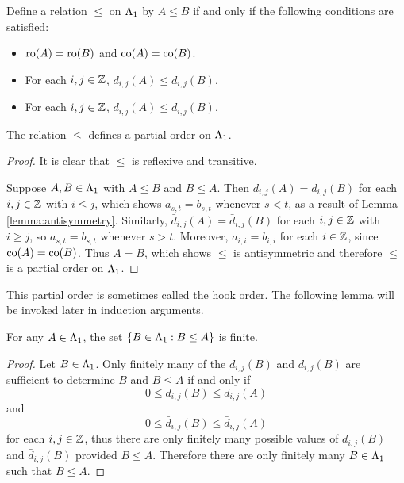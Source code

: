 \documentclass[a4paper, 11pt]{report}
\begin{document}
Define a relation $\le$ on $\Lambda_1{}$ by $A\le B$ if and only if the following conditions are satisfied:
\begin{itemize}
\item
$\operatorname{ro}(A)=\operatorname{ro}(B)$ and $\operatorname{co}(A)=\operatorname{co}(B)$.
\item
For each $i,j\in\mathbb{Z}$, $d_{i,j}{(A)}\le d_{i,j}{(B)}$.
\item
For each $i,j\in\mathbb{Z}$, $\bar{d}_{i,j}{(A)} \le \bar{d}_{i,j}{(B)}$.
\end{itemize}

\begin{lemma}\label{lemma:orbit-poset}
The relation $\le$ defines a partial order on $\Lambda_1{}$.
\end{lemma}

\begin{proof}
It is clear that $\le$ is reflexive and transitive.

Suppose $A,B\in\Lambda_1{}$ with $A\le B$ and $B\le A$. Then $d_{i,j}{(A)} = d_{i,j}{(B)}$ for each $i,j\in\mathbb{Z}$ with $i\le j$, which shows $a_{s,t}=b_{s,t}$ whenever $s<t$, as a result of Lemma \ref{lemma:antisymmetry}. Similarly, $\bar{d}_{i,j}{(A)} = \bar{d}_{i,j}{(B)}$ for each $i,j\in\mathbb{Z}$ with $i\geq j$, so $a_{s,t}=b_{s,t}$ whenever $s>t$. Moreover, $a_{i,i}=b_{i,i}$ for each $i\in\mathbb{Z}$, since $\operatorname{co}(A)=\operatorname{co}(B)$. Thus $A=B$, which shows $\le$ is antisymmetric and therefore $\le$ is a partial order on $\Lambda_1{}$.
\end{proof}

This partial order is sometimes called the hook order. The following lemma will be invoked later in induction arguments.

\begin{lemma}\label{lemma:finite-descent-hook-order}
For any $A\in\Lambda_1{}$, the set $\{B\in\Lambda_1{}:B\le A\}$ is finite.
\end{lemma}

\begin{proof}
Let $B\in\Lambda_1{}$. Only finitely many of the $d_{i,j}{(B)}$ and $\bar{d}_{i,j}{(B)}$ are sufficient to determine $B$ and $B\le A$ if and only if
\begin{equation*}
0\le d_{i,j}{(B)} \le d_{i,j}{(A)}
\end{equation*}
and
\begin{equation*}
0\le \bar{d}_{i,j}{(B)} \le \bar{d}_{i,j}{(A)}
\end{equation*}
for each $i,j\in\mathbb{Z}$, thus there are only finitely many possible values of $d_{i,j}{(B)}$ and $\bar{d}_{i,j}{(B)}$ provided $B\le A$. Therefore there are only finitely many $B\in\Lambda_1{}$ such that $B\le A$.
\end{proof}
\end{document}

